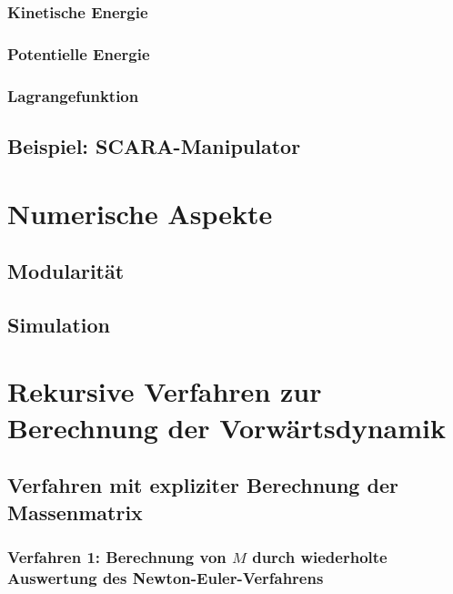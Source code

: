 \documentclass[a4paper, 11pt, accentcolor = tud3b]{tudreport}
\begin{document}
				\subsubsection{Kinetische Energie} %

				\subsubsection{Potentielle Energie} %

				\subsubsection{Lagrangefunktion} %

			\subsection{Beispiel: SCARA-Manipulator} %

		\section{Numerische Aspekte} %

			\subsection{Modularität} %

			\subsection{Simulation} %

		\section{Rekursive Verfahren zur Berechnung der Vorwärtsdynamik} %

			\subsection{Verfahren mit expliziter Berechnung der Massenmatrix} %

				\subsubsection{Verfahren 1: Berechnung von \(M\) durch wiederholte Auswertung des Newton-Euler-Verfahrens} %
\end{document}

